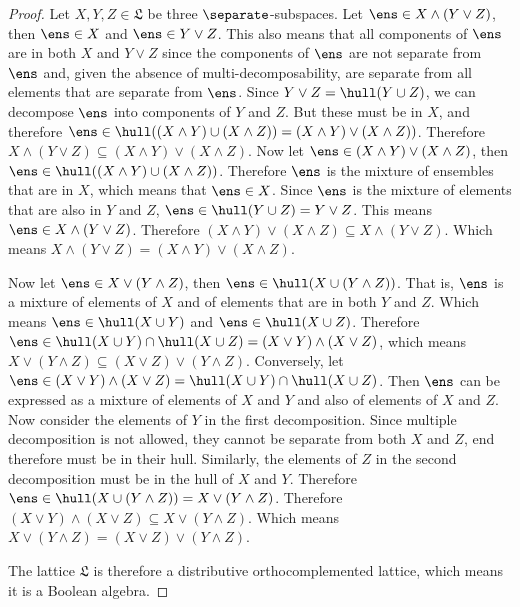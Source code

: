 \begin{proof}
	Let $X,Y,Z \in \mathfrak{L}$ be three $\separate$-subspaces. Let $\ens \in X \wedge (Y \vee Z)$, then $\ens \in X$ and $\ens \in Y \vee Z$. This also means that all components of $\ens$ are in both $X$ and $Y \vee Z$ since the components of $\ens$ are not separate from $\ens$ and, given the absence of multi-decomposability, are separate from all elements that are separate from $\ens$. Since $Y \vee Z = \hull(Y \cup Z)$, we can decompose $\ens$ into components of $Y$ and $Z$. But these must be in $X$, and therefore $\ens \in \hull((X \wedge Y) \cup (X \wedge Z) ) = (X \wedge Y) \vee (X \wedge Z) )$. Therefore $X \wedge (Y \vee Z) \subseteq (X \wedge Y) \vee (X \wedge Z)$. Now let $\ens \in (X \wedge Y) \vee (X \wedge Z)$, then $\ens \in \hull((X \wedge Y) \cup (X \wedge Z) )$. Therefore $\ens$ is the mixture of ensembles that are in $X$, which means that $\ens \in X$. Since $\ens$ is the mixture of elements that are also in $Y$ and $Z$, $\ens \in \hull(Y \cup Z) = Y \vee Z$. This means $\ens \in X \wedge (Y \vee Z)$. Therefore $(X \wedge Y) \vee (X \wedge Z) \subseteq X \wedge (Y \vee Z)$. Which means $X \wedge (Y \vee Z) = (X \wedge Y) \vee (X \wedge Z)$.
	
	Now let $\ens \in X \vee (Y \wedge Z)$, then $\ens \in \hull(X \cup (Y \wedge Z) )$. That is, $\ens$ is a mixture of elements of $X$ and of elements that are in both $Y$ and $Z$. Which means $\ens \in \hull(X \cup Y)$ and $\ens \in \hull(X \cup Z)$. Therefore $\ens \in \hull(X \cup Y) \cap \hull(X \cup Z) = (X \vee Y) \wedge (X \vee Z)$, which means $X \vee (Y \wedge Z) \subseteq (X \vee Z) \vee (Y \wedge Z)$. Conversely, let $\ens \in (X \vee Y) \wedge (X \vee Z) = \hull(X \cup Y) \cap \hull(X \cup Z)$. Then $\ens$ can be expressed as a mixture of elements of $X$ and $Y$ and also of elements of $X$ and $Z$. Now consider the elements of $Y$ in the first decomposition. Since multiple decomposition is not allowed, they cannot be separate from both $X$ and $Z$, end therefore must be in their hull. Similarly, the elements of $Z$ in the second decomposition must be in the hull of $X$ and $Y$. Therefore $\ens \in \hull(X \cup (Y \wedge Z) ) = X \vee (Y \wedge Z)$. Therefore $(X \vee Y) \wedge (X \vee Z) \subseteq X \vee (Y \wedge Z)$. Which means $X \vee (Y \wedge Z) = (X \vee Z) \vee (Y \wedge Z)$.
	
	The lattice $\mathfrak{L}$ is therefore a distributive orthocomplemented lattice, which means it is a Boolean algebra.
\end{proof}

